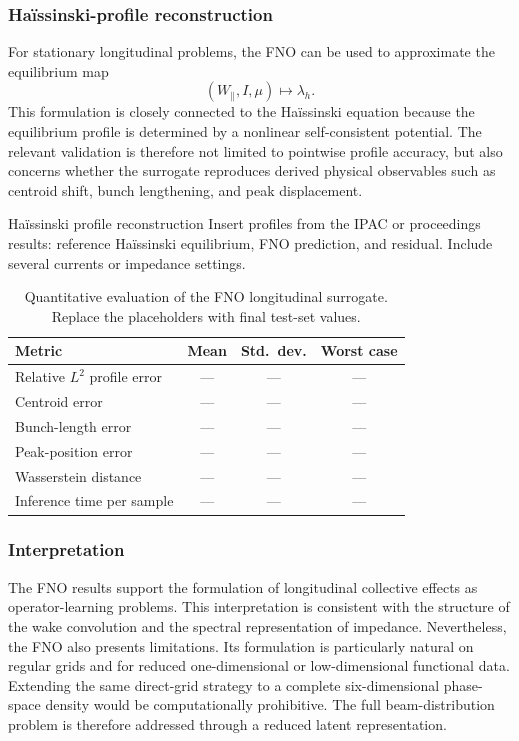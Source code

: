 \subsubsection{Ha\"issinski-profile reconstruction}
\label{subsubsec:fno_haissinski_results}

For stationary longitudinal problems, the FNO can be used to approximate the equilibrium map
\begin{equation}
(W_{\parallel},I,\mu)
\mapsto
\lambda_h.
\label{eq:fno_haissinski_map_results}
\end{equation}
This formulation is closely connected to the Ha\"issinski equation because the equilibrium profile is determined by a nonlinear self-consistent potential. The relevant validation is therefore not limited to pointwise profile accuracy, but also concerns whether the surrogate reproduces derived physical observables such as centroid shift, bunch lengthening, and peak displacement.

\placeholderfigure
{Ha\"issinski profile reconstruction}
{Insert profiles from the IPAC or proceedings results: reference Ha\"issinski equilibrium, FNO prediction, and residual. Include several currents or impedance settings.}

\begin{table}[H]
\centering
\caption{
Quantitative evaluation of the FNO longitudinal surrogate. Replace the placeholders with final test-set values.
}
\label{tab:fno_longitudinal_metrics}
\begin{tabular}{lccc}
\toprule
Metric & Mean & Std.\ dev. & Worst case \\
\midrule
Relative $L^2$ profile error & --- & --- & --- \\
Centroid error & --- & --- & --- \\
Bunch-length error & --- & --- & --- \\
Peak-position error & --- & --- & --- \\
Wasserstein distance & --- & --- & --- \\
Inference time per sample & --- & --- & --- \\
\bottomrule
\end{tabular}
\end{table}

\subsubsection{Interpretation}
\label{subsubsec:fno_interpretation}

The FNO results support the formulation of longitudinal collective effects as operator-learning problems. This interpretation is consistent with the structure of the wake convolution and the spectral representation of impedance. Nevertheless, the FNO also presents limitations. Its formulation is particularly natural on regular grids and for reduced one-dimensional or low-dimensional functional data. Extending the same direct-grid strategy to a complete six-dimensional phase-space density would be computationally prohibitive. The full beam-distribution problem is therefore addressed through a reduced latent representation.

